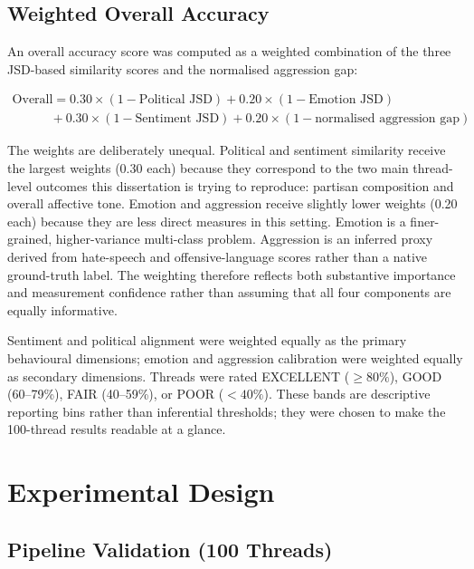 \documentclass[logo,bsc,singlespacing,parskip,online]{infthesis}
\begin{document}
\subsection{Weighted Overall Accuracy}

An overall accuracy score was computed as a weighted combination of the three JSD-based similarity scores and the normalised aggression gap:

\begin{equation}
\begin{array}{l}
\text{Overall} = 0.30 \times (1 - \text{Political JSD}) + 0.20 \times (1 - \text{Emotion JSD}) \\
\qquad\quad + 0.30 \times (1 - \text{Sentiment JSD}) + 0.20 \times (1 - \text{normalised aggression gap})
\end{array}
\end{equation}

The weights are deliberately unequal. Political and sentiment similarity receive the largest weights (0.30 each) because they correspond to the two main thread-level outcomes this dissertation is trying to reproduce: partisan composition and overall affective tone. Emotion and aggression receive slightly lower weights (0.20 each) because they are less direct measures in this setting. Emotion is a finer-grained, higher-variance multi-class problem. Aggression is an inferred proxy derived from hate-speech and offensive-language scores rather than a native ground-truth label. The weighting therefore reflects both substantive importance and measurement confidence rather than assuming that all four components are equally informative.

Sentiment and political alignment were weighted equally as the primary behavioural dimensions; emotion and aggression calibration were weighted equally as secondary dimensions. Threads were rated EXCELLENT ($\geq 80\%$), GOOD (60--79\%), FAIR (40--59\%), or POOR ($< 40\%$). These bands are descriptive reporting bins rather than inferential thresholds; they were chosen to make the 100-thread results readable at a glance.

\section{Experimental Design}

\subsection{Pipeline Validation (100 Threads)}
\end{document}
